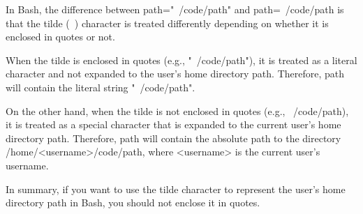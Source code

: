 In Bash, the difference between path="~/code/path" and path=~/code/path is that the tilde (~) character is treated differently depending on whether it is enclosed in quotes or not.

When the tilde is enclosed in quotes (e.g., "~/code/path"), it is treated as a literal character and not expanded to the user's home directory path. Therefore, path will contain the literal string "~/code/path".

On the other hand, when the tilde is not enclosed in quotes (e.g., ~/code/path), it is treated as a special character that is expanded to the current user's home directory path. Therefore, path will contain the absolute path to the directory /home/<username>/code/path, where <username> is the current user's username.

In summary, if you want to use the tilde character to represent the user's home directory path in Bash, you should not enclose it in quotes.
